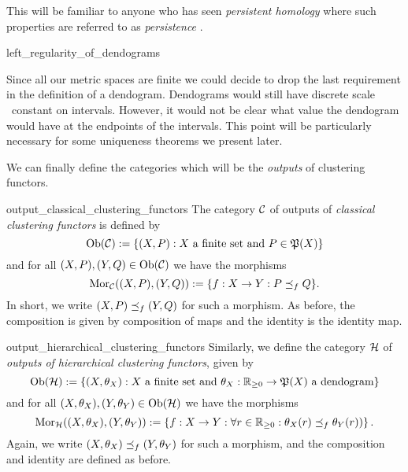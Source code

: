 This will be familiar to anyone who has seen \emph{persistent homology} where such properties are referred to as \emph{persistence} \cite[Chap.~3]{Carlsson2014}. 

\begin{myremark}{}{left_regularity_of_dendograms}

Since all our metric spaces are finite we could decide to drop the last requirement in the definition of a dendogram. Dendograms would still have discrete scale \ie\ constant on intervals.
However, it would not be clear what value the dendogram would have at the endpoints of the intervals.
This point will be particularly necessary for some uniqueness theorems we present later.
\end{myremark}

We can finally define the categories which will be the \emph{outputs} of clustering functors.

\begin{definition}{\cite[Def.~3.2]{Carlsson2010}}{output_classical_clustering_functors}
The category $\mathcal{C}$ of outputs of \emph{classical clustering functors} is defined by
\begin{equation*}
    \mathrm {Ob}(\mathcal{C}) := \{(X, P): X \text{ a finite set and } P \in \mathfrak{P}(X)\}
\end{equation*}
and for all $(X,P), (Y,Q) \in \mathrm {Ob}(\mathcal{C})$ we have the morphisms
\begin{equation*}
    \mathrm {Mor}_{\mathcal{C}}((X,P), (Y,Q)) := \{f: X \to Y: P \preceq_f Q\}.
\end{equation*}
In short, we write $(X,P) \preceq_f (Y,Q)$ for such a morphism. As before, the composition is given by composition of maps and the identity is the identity map.
\end{definition}

\begin{definition}{\cite[Def.~3.3]{Carlsson2010}}{output_hierarchical_clustering_functors}
Similarly, we define the category $\mathcal{H}$ of \emph{outputs of hierarchical clustering functors}, given by
\begin{equation*}
    \mathrm {Ob}(\mathcal{H}) := \{(X, \theta_X): X \text{ a finite set and } \theta_X: \mathbb R_{\geq0} \to \mathfrak{P}(X) \ \text{a dendogram}\}
\end{equation*}
and for all $(X, \theta_X), (Y, \theta_Y) \in \mathrm {Ob}(\mathcal{H})$ we have the morphisms
\begin{equation*}
    \mathrm {Mor}_{\mathcal{H}}((X, \theta_X), (Y,\theta_Y)) :=
    \left\{f: X \to Y: \forall r \in \mathbb R_{\geq0}: \theta_X(r) \preceq_f \theta_Y(r)) \right\}.
\end{equation*}
Again, we write $(X, \theta_X) \preceq_f (Y, \theta_Y)$ for such a morphism, and the composition and identity are defined as before.
\end{definition}

